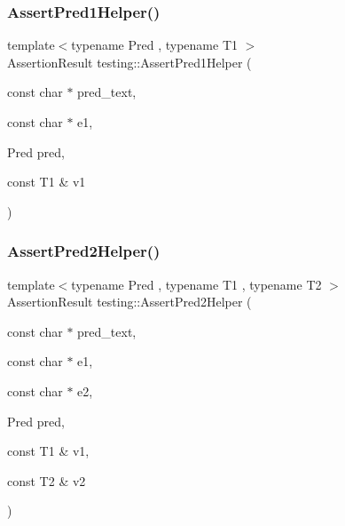 \mbox{\label{namespacetesting_a7f73180474723be6e92185d6fa9e7c9f}} 
\subsubsection{\texorpdfstring{Assert\+Pred1\+Helper()}{AssertPred1Helper()}}
{\footnotesize\ttfamily template$<$typename Pred , typename T1 $>$ \\
Assertion\+Result testing\+::\+Assert\+Pred1\+Helper (\begin{DoxyParamCaption}\item[{const char $\ast$}]{pred\+\_\+text,  }\item[{const char $\ast$}]{e1,  }\item[{Pred}]{pred,  }\item[{const T1 \&}]{v1 }\end{DoxyParamCaption})}

\mbox{\label{namespacetesting_aa6587938029dd8733ecb885068f08247}} 
\subsubsection{\texorpdfstring{Assert\+Pred2\+Helper()}{AssertPred2Helper()}}
{\footnotesize\ttfamily template$<$typename Pred , typename T1 , typename T2 $>$ \\
Assertion\+Result testing\+::\+Assert\+Pred2\+Helper (\begin{DoxyParamCaption}\item[{const char $\ast$}]{pred\+\_\+text,  }\item[{const char $\ast$}]{e1,  }\item[{const char $\ast$}]{e2,  }\item[{Pred}]{pred,  }\item[{const T1 \&}]{v1,  }\item[{const T2 \&}]{v2 }\end{DoxyParamCaption})}

\mbox{\label{namespacetesting_ac92dcbd00a0ffb2913e65d286e321a22}} 
